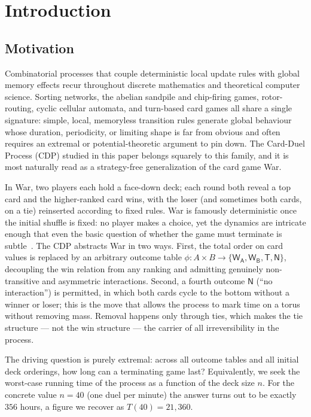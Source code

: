 \documentclass[11pt]{article}
\theoremstyle{definition}
\theoremstyle{remark}
\newcommand{\WA}{\mathsf{W_A}}
\newcommand{\WB}{\mathsf{W_B}}
\newcommand{\TT}{\mathsf{T}}
\newcommand{\NN}{\mathsf{N}}
\begin{document}
\section{Introduction}

\subsection{Motivation}
Combinatorial processes that couple deterministic local update rules with global memory effects
recur throughout discrete mathematics and theoretical computer science. Sorting networks, the
abelian sandpile and chip-firing games, rotor-routing, cyclic cellular automata, and turn-based
card games all share a single signature: simple, local, memoryless transition rules generate global
behaviour whose duration, periodicity, or limiting shape is far from obvious and often requires an
extremal or potential-theoretic argument to pin down. The Card-Duel Process (CDP) studied in this
paper belongs squarely to this family, and it is most naturally read as a strategy-free generalization
of the card game War.

In War, two players each hold a face-down deck; each round both reveal a top card and the
higher-ranked card wins, with the loser (and sometimes both cards, on a tie) reinserted according
to fixed rules. War is famously deterministic once the initial shuffle is fixed: no player makes a
choice, yet the dynamics are intricate enough that even the basic question of whether the game must
terminate is subtle~\cite{LR}. The CDP abstracts War in two ways. First, the total order on card values
is replaced by an arbitrary outcome table $\phi : A \times B \to \{\WA, \WB, \TT, \NN\}$, decoupling the win relation
from any ranking and admitting genuinely non-transitive and asymmetric interactions. Second, a
fourth outcome $\NN$ (``no interaction'') is permitted, in which both cards cycle to the bottom without
a winner or loser; this is the move that allows the process to mark time on a torus without removing
mass. Removal happens only through ties, which makes the tie structure --- not the win structure ---
the carrier of all irreversibility in the process.

The driving question is purely extremal: across all outcome tables and all initial deck orderings,
how long can a terminating game last? Equivalently, we seek the worst-case running time of the
process as a function of the deck size $n$. For the concrete value $n = 40$ (one duel per minute) the
answer turns out to be exactly $356$ hours, a figure we recover as $T(40) = 21{,}360$.
\end{document}
